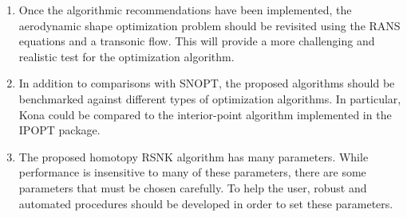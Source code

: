 \begin{enumerate}
\item Once the algorithmic recommendations have been implemented, the aerodynamic shape optimization problem should be revisited using the RANS equations and a transonic flow.  This will provide a more challenging and realistic test for the optimization algorithm. 

\item In addition to comparisons with SNOPT, the proposed algorithms should be benchmarked against different types of optimization algorithms.  In particular, Kona could be compared to the interior-point algorithm implemented in the IPOPT package.

\item The proposed homotopy RSNK algorithm has many parameters.  While performance is insensitive to many of these parameters, there are some parameters that must be chosen carefully.  To help the user, robust and automated procedures should be developed in order to set these parameters.

\end{enumerate}




